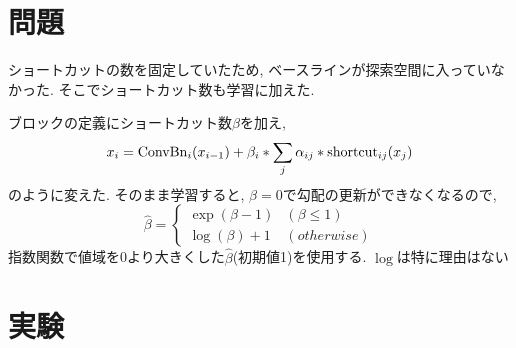\documentclass[twocolumn]{jarticle}     %
\begin{document}



\section{問題}
ショートカットの数を固定していたため, ベースラインが探索空間に入っていなかった.
そこでショートカット数も学習に加えた.

ブロックの定義にショートカット数$\beta$を加え,
\begin{equation}
  \label{equ:cut}
  x_i = {\rm ConvBn}_{i}(x_{i-1}) + \beta_i * \sum_j \alpha_{ij} * {\rm shortcut}_{ij} (x_j)
\end{equation}
のように変えた.
そのまま学習すると, $\beta=0$で勾配の更新ができなくなるので,
\begin{equation}
  \label{equ:cut}
  \hat{\beta} = \begin{cases}
    \exp(\beta - 1) & (\beta \leq 1) \\
    \log(\beta) + 1 & (otherwise)
  \end{cases}
\end{equation}
指数関数で値域を0より大きくした$\hat{\beta}$(初期値1)を使用する. $\log$は特に理由はない

\section{実験}
\end{document}

